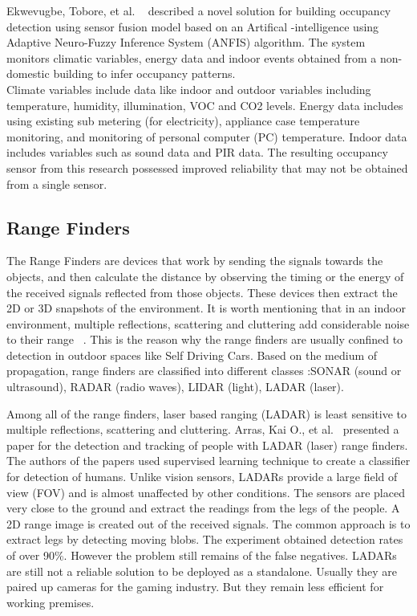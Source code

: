 Ekwevugbe, Tobore, et al.  ~\cite{ekwevugbe2012design} described a novel solution for building occupancy detection using sensor fusion model based on an Artifical -intelligence using Adaptive Neuro-Fuzzy Inference System (ANFIS) algorithm. The system monitors climatic variables, energy data and indoor events obtained from a non-domestic building to infer occupancy patterns.
\\
Climate variables include data like indoor and outdoor variables including temperature, humidity, illumination, VOC and CO2 levels.
Energy data includes using existing sub metering
(for electricity), appliance case temperature monitoring, and monitoring of personal computer (PC) temperature.
Indoor data includes variables such as sound data and  PIR data. The resulting occupancy sensor from this research possessed improved reliability that may not be obtained from a single sensor. 

\subsection{Range Finders}
The Range Finders are devices that work by sending the signals towards the objects, and then calculate the distance by observing the timing or the energy of the received signals reflected from those objects. These devices then extract the 2D or 3D snapshots of the environment. It is worth mentioning that in an indoor environment, multiple reflections, scattering and cluttering add considerable noise to their range ~\cite{teixeira2010survey}. This is the reason why the range finders are usually confined to detection in outdoor spaces like Self Driving Cars. 
Based on the medium of propagation, range finders are classified into different classes :SONAR (sound or ultrasound),  RADAR (radio waves), LIDAR
(light), LADAR (laser).

Among all of the range finders, laser based ranging (LADAR) is least sensitive to multiple reflections, scattering and cluttering. Arras, Kai O., et al.~\cite{arras2007using} presented a paper for the detection and tracking of people with LADAR (laser) range finders. The authors of the papers used supervised learning technique to create a classifier for detection of humans. Unlike vision sensors, LADARs provide a large field of view (FOV) and is almost unaffected by other conditions. The sensors are placed very close to the ground and extract the readings from the legs of the people. A 2D range image is created out of the received signals. The common approach is to extract legs by detecting moving blobs. The experiment obtained detection rates of over 90\%. However the problem still remains of the false negatives. LADARs are still not a reliable solution to be deployed as a standalone. Usually they are paired up cameras for the gaming industry. But they remain less efficient for working premises.
\\

